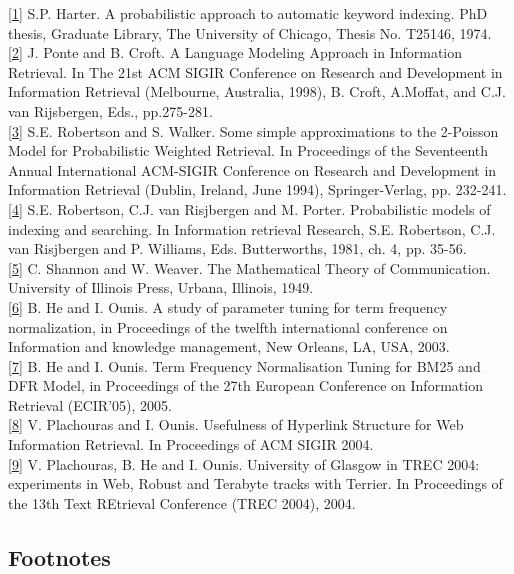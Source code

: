 {[}\protect\hyperlink{1text}{1}{]} S.P. Harter. A probabilistic approach
to automatic keyword indexing. PhD thesis, Graduate Library, The
University of Chicago, Thesis No. T25146, 1974.\\
{[}\protect\hyperlink{2text}{2}{]} J. Ponte and B. Croft. A Language
Modeling Approach in Information Retrieval. In The 21st ACM SIGIR
Conference on Research and Development in Information Retrieval
(Melbourne, Australia, 1998), B. Croft, A.Moffat, and C.J. van
Rijsbergen, Eds., pp.275-281.\\
{[}\protect\hyperlink{3text}{3}{]} S.E. Robertson and S. Walker. Some
simple approximations to the 2-Poisson Model for Probabilistic Weighted
Retrieval. In Proceedings of the Seventeenth Annual International
ACM-SIGIR Conference on Research and Development in Information
Retrieval (Dublin, Ireland, June 1994), Springer-Verlag, pp. 232-241.\\
{[}\protect\hyperlink{4text}{4}{]} S.E. Robertson, C.J. van Risjbergen
and M. Porter. Probabilistic models of indexing and searching. In
Information retrieval Research, S.E. Robertson, C.J. van Risjbergen and
P. Williams, Eds. Butterworths, 1981, ch. 4, pp. 35-56.\\
{[}\protect\hyperlink{5text}{5}{]} C. Shannon and W. Weaver. The
Mathematical Theory of Communication. University of Illinois Press,
Urbana, Illinois, 1949.\\
{[}\protect\hyperlink{6text}{6}{]} B. He and I. Ounis. A study of
parameter tuning for term frequency normalization, in Proceedings of the
twelfth international conference on Information and knowledge
management, New Orleans, LA, USA, 2003.\\
{[}\protect\hyperlink{6text}{7}{]} B. He and I. Ounis. Term Frequency
Normalisation Tuning for BM25 and DFR Model, in Proceedings of the 27th
European Conference on Information Retrieval (ECIR'05), 2005.\\
{[}\protect\hyperlink{7text}{8}{]} V. Plachouras and I. Ounis.
Usefulness of Hyperlink Structure for Web Information Retrieval. In
Proceedings of ACM SIGIR 2004.\\
{[}\protect\hyperlink{8text}{9}{]} V. Plachouras, B. He and I. Ounis.
University of Glasgow in TREC 2004: experiments in Web, Robust and
Terabyte tracks with Terrier. In Proceedings of the 13th Text REtrieval
Conference (TREC 2004), 2004.

\subsection{Footnotes}\label{footnotes}

